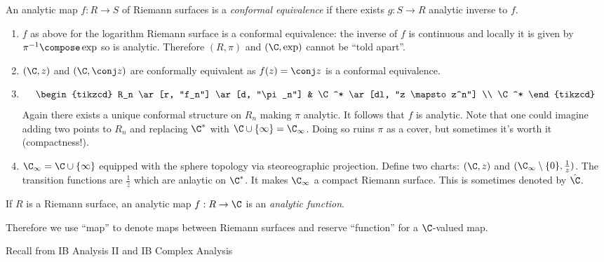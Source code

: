 \documentclass[a4paper]{article}
\begin{document}
\begin{definition}
  An analytic map \(f: R \to S\) of Riemann surfaces is a \emph{conformal equivalence} if there exists \(g: S \to R\) analytic inverse to \(f\).
\end{definition}

\begin{eg}\leavevmode
  \begin{enumerate}
  \item \(f\) as above for the logarithm Riemann surface is a conformal equivalence: the inverse of \(f\) is continuous and locally it is given by \(\pi^{-1} \compose \exp\) so is analytic. Therefore \((R, \pi)\) and \((\C, \exp)\) cannot be ``told apart''.
  \item \((\C, z)\) and \((\C, \conj z)\) are conformally equivalent as \(f(z) = \conj z\) is a conformal equivalence.
  \item
    \[
      \begin{tikzcd}
        R_n \ar[r, "f_n"] \ar[d, "\pi_n"] & \C^* \ar[dl, "z \mapsto z^n"] \\
        \C^*
      \end{tikzcd}
    \]
    Again there exists a unique conformal structure on \(R_n\) making \(\pi\) analytic. It follows that \(f\) is analytic. Note that one could imagine adding two points to \(R_n\) and replacing \(\C^*\) with \(\C \cup \{\infty\} = \C_\infty\). Doing so ruins \(\pi\) as a cover, but sometimes it's worth it (compactness!).
  \item \(\C_\infty = \C \cup \{\infty\}\) equipped with the sphere topology via steoreographic projection. Define two charts: \((\C, z)\) and \((\C_\infty \setminus \{0\}, \frac{1}{z})\). The transition functions are \(\frac{1}{z}\) which are anlaytic on \(\C^*\). It makes \(\C_\infty\) a compact Riemann surface. This is sometimes denoted by \(\hat \C\).
  \end{enumerate}
\end{eg}

\begin{definition}
  If \(R\) is a Riemann surface, an analytic map \(f: R \to \C\) is an \emph{analytic function}.
\end{definition}

Therefore we use ``map'' to denote maps between Riemann surfaces and reserve ``function'' for a \(\C\)-valued map.

Recall from IB Analysis II and IB Complex Analysis
\end{document}
